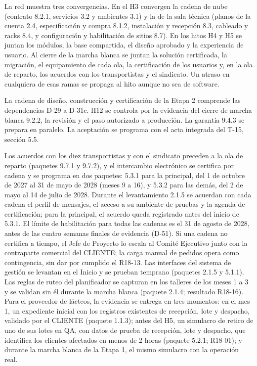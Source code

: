 La red muestra tres convergencias. En el H3 convergen la cadena de nube (contrato 8.2.1, servicios 3.2 y ambientes 3.1) y la de la sala técnica (planos de la cuenta 2.4, especificación y compra 8.1.2, instalación y recepción 8.3, cableado y racks 8.4, y configuración y habilitación de sitios 8.7). En los hitos H4 y H5 se juntan los módulos, la base compartida, el diseño aprobado y la experiencia de usuario. Al cierre de la marcha blanca se juntan la solución certificada, la migración, el equipamiento de cada ola, la certificación de los usuarios y, en la ola de reparto, los acuerdos con los transportistas y el sindicato. Un atraso en cualquiera de esas ramas se propaga al hito aunque no sea de software.

La cadena de diseño, construcción y certificación de la Etapa 2 comprende las dependencias D-29 a D-31c. H12 se controla por la evidencia del cierre de marcha blanca 9.2.2, la revisión y el paso autorizado a producción. La garantía 9.4.3 se prepara en paralelo. La aceptación se programa con el acta integrada del T-15, sección 5.5.

Los acuerdos con los diez transportistas y con el sindicato preceden a la ola de reparto (paquetes 9.7.1 y 9.7.2), y el intercambio electrónico se certifica por cadena y se programa en dos paquetes: 5.3.1 para la principal, del 1 de octubre de 2027 al 31 de mayo de 2028 (meses 9 a 16), y 5.3.2 para las demás, del 2 de mayo al 14 de julio de 2028. Durante el levantamiento 2.1.5 se acuerdan con cada cadena el perfil de mensajes, el acceso a su ambiente de pruebas y la agenda de certificación; para la principal, el acuerdo queda registrado antes del inicio de 5.3.1. El límite de habilitación para todas las cadenas es el 31 de agosto de 2028, antes de las cuatro semanas finales de evidencia (D-51). Si una cadena no certifica a tiempo, el Jefe de Proyecto lo escala al Comité Ejecutivo junto con la contraparte comercial del CLIENTE; la carga manual de pedidos opera como contingencia, sin dar por cumplido el R18-13. Las interfaces del sistema de gestión se levantan en el Inicio y se prueban temprano (paquetes 2.1.5 y 5.1.1). Las reglas de ruteo del planificador se capturan en los talleres de los meses 1 a 3 y se validan sin él durante la marcha blanca (paquete 2.1.4; resultado R18-16). Para el proveedor de lácteos, la evidencia se entrega en tres momentos: en el mes 1, un expediente inicial con los registros existentes de recepción, lote y despacho, validado por el CLIENTE (paquete 1.1.3); antes del H5, un simulacro de retiro de uno de sus lotes en QA, con datos de prueba de recepción, lote y despacho, que identifica los clientes afectados en menos de 2 horas (paquete 5.2.1; R18-01); y durante la marcha blanca de la Etapa 1, el mismo simulacro con la operación real.

